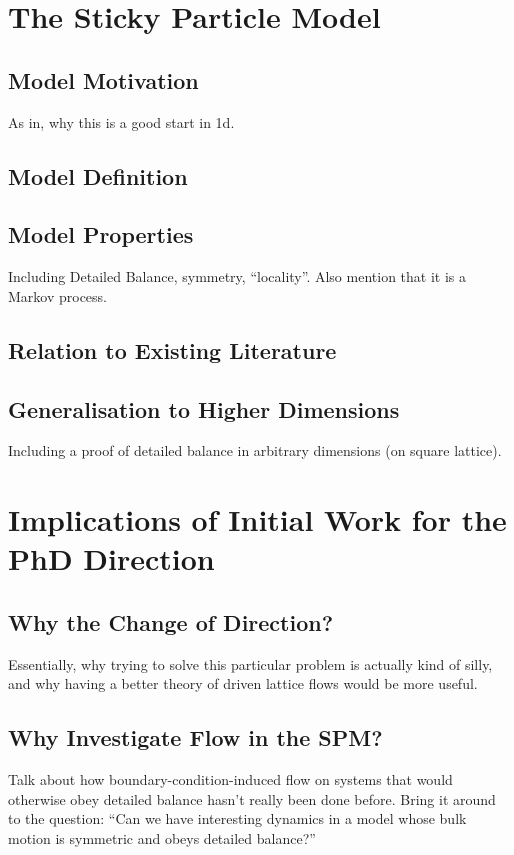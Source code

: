 \section{The Sticky Particle Model}
\subsection{Model Motivation}
As in, why this is a good start in 1d.
\subsection{Model Definition}
\subsection{Model Properties}
Including Detailed Balance, symmetry, ``locality''. Also mention that it is a Markov process.
\subsection{Relation to Existing Literature}
\subsection{Generalisation to Higher Dimensions}
Including a proof of detailed balance in arbitrary dimensions (on square lattice).

\section{Implications of Initial Work for the PhD Direction}
\subsection{Why the Change of Direction?}
Essentially, why trying to solve this particular problem is actually kind of silly, and why having a better theory of driven lattice flows would be more useful.
\subsection{Why Investigate Flow in the SPM?}
Talk about how boundary-condition-induced flow on systems that would otherwise obey detailed balance hasn't really been done before.
Bring it around to the question:
``Can we have interesting dynamics in a model whose bulk motion is symmetric and obeys detailed balance?''

